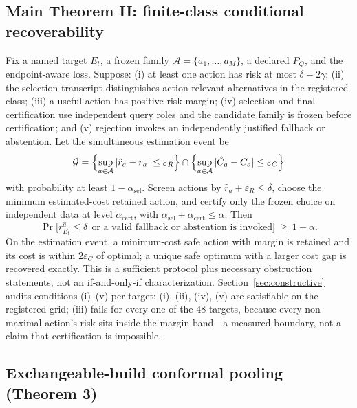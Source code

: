 \documentclass{article}
\renewcommand{\Pr}{\mathop{\mathrm{Pr}}}   %
\newcommand{\Acal}{\mathcal{A}}
\begin{document}
\subsection{Main Theorem II: finite-class conditional recoverability}

Fix a named target $E_t$, a frozen family $\Acal=\{a_1,\dots,a_M\}$, a declared $P_Q$, and the
endpoint-aware loss. Suppose: (i) at least one action has risk at most $\delta-2\gamma$; (ii) the selection
transcript distinguishes action-relevant alternatives in the registered class; (iii) a useful action has
positive risk margin; (iv) selection and final certification use independent query roles and the candidate
family is frozen before certification; and (v) rejection invokes an independently justified fallback or
abstention. Let the simultaneous estimation event be
\begin{equation}
\mathcal{G}
=\Bigl\{\sup_{a\in\Acal}|\hat r_{a}-r_{a}|\le\varepsilon_{R}\Bigr\}
\cap\Bigl\{\sup_{a\in\Acal}|\hat C_{a}-C_{a}|\le\varepsilon_{C}\Bigr\}
\label{eq:eventG}
\end{equation}
with probability at least $1-\alpha_{\mathrm{sel}}$. Screen actions by $\hat r_{a}+\varepsilon_{R}\le\delta$,
choose the minimum estimated-cost retained action, and certify only the frozen choice on independent data at
level $\alpha_{\mathrm{cert}}$, with $\alpha_{\mathrm{sel}}+\alpha_{\mathrm{cert}}\le\alpha$. Then
\begin{equation}
\Pr\bigl[r_{E_{t}}^{\hat a}\le\delta\ \ \text{or a valid fallback or abstention is invoked}\bigr]\ \ge\ 1-\alpha.
\label{eq:thm2}
\end{equation}
On the estimation event, a minimum-cost safe action with margin is retained and its cost is within
$2\varepsilon_{C}$ of optimal; a unique safe optimum with a larger cost gap is recovered exactly. This is a
sufficient protocol plus necessary obstruction statements, not an if-and-only-if characterization.
Section~\ref{sec:constructive} audits conditions (i)--(v) per target: (i), (ii), (iv), (v) are satisfiable
on the registered grid; (iii) fails for every one of the 48 targets, because every non-maximal action's risk
sits inside the margin band---a measured boundary, not a claim that certification is impossible.

\subsection{Exchangeable-build conformal pooling (Theorem 3)}
\label{sec:thm3}
\end{document}
